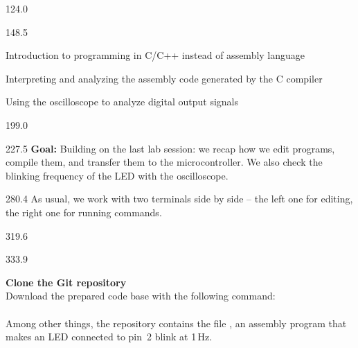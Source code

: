\documentclass{aslab}
\begin{document}
\maketitleblock

\begin{region}{124.0}
\end{region}

\begin{region}{148.5}
\begin{bluedash}
\item Introduction to programming in C/C++ instead of assembly language
\item Interpreting and analyzing the assembly code generated by the C
  compiler
\item Using the oscilloscope to analyze digital output signals
\end{bluedash}
\end{region}

\begin{region}{199.0}
\end{region}

\begin{region}[pitch=13.25]{227.5}
\textbf{Goal:} Building on the last lab session: we recap how we edit
programs, compile them, and transfer them to the microcontroller. We also
check the blinking frequency of the LED with the oscilloscope.
\end{region}

\begin{region}[pitch=13.1]{280.4}
As usual, we work with two terminals side by side -- the left one for
editing, the right one for running commands.
\end{region}

\begin{region}{319.6}
\end{region}

\begin{region}[pitch=12.17]{333.9}
\begin{alphatasks}
\item \textbf{Clone the Git repository}\\
  Download the prepared code base with the following command:\\
  \\
  Among other things, the repository contains the file
  , an assembly program that makes an LED connected
  to pin~2 blink at 1\,Hz.
\end{alphatasks}
\end{region}
\end{document}
